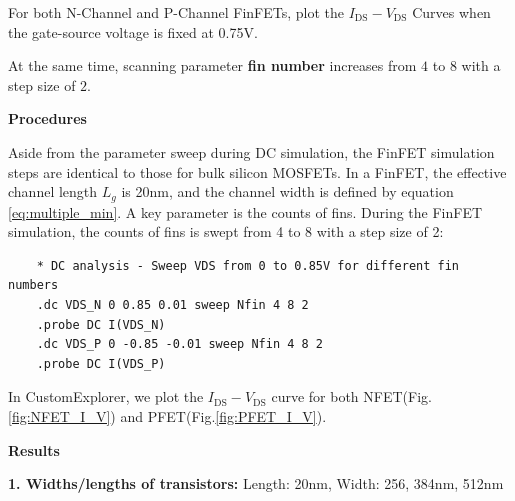 \documentclass[UTF8,12pt,a4paper]{article}
\begin{document}
For both N-Channel and P-Channel FinFETs, plot the $I_{\text{DS}}-V_{\text{DS}}$ Curves when the gate-source voltage is fixed at 0.75V. 

At the same time, scanning parameter \textbf{fin number} increases from $4$ to $8$ with a step size of $2$.

\textbf{Procedures}

Aside from the parameter sweep during DC simulation, the FinFET simulation steps are identical to those for bulk silicon MOSFETs.
In a FinFET, the effective channel length $L_{g}$ is 20nm, and the channel width is defined by equation \eqref{eq:multiple_min}. A key parameter is the counts of fins. During the FinFET simulation, the counts of fins is swept from 4 to 8 with a step size of 2: 
\begin{lstlisting}
	* DC analysis - Sweep VDS from 0 to 0.85V for different fin numbers
	.dc VDS_N 0 0.85 0.01 sweep Nfin 4 8 2
	.probe DC I(VDS_N) 
	.dc VDS_P 0 -0.85 -0.01 sweep Nfin 4 8 2
	.probe DC I(VDS_P)
\end{lstlisting}

In CustomExplorer, we plot the $I_{\text{DS}}-V_{\text{DS}}$ curve for both NFET(Fig.\ref{fig:NFET_I_V}) and PFET(Fig.\ref{fig:PFET_I_V}). 

\textbf{Results}

\textbf{1. Widths/lengths of transistors:} Length: 20nm, Width: 256, 384nm, 512nm
\end{document}
